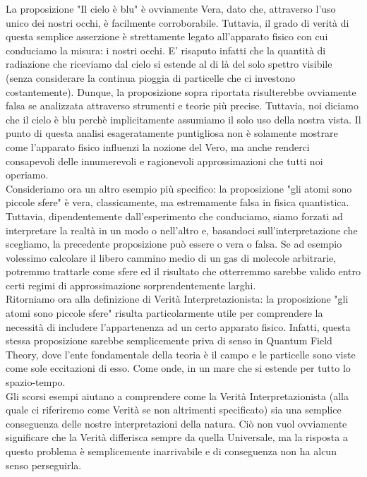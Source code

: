 \documentclass[]{scrbook}
\begin{document}
	La proposizione "Il cielo è blu" è ovviamente Vera, dato che, attraverso l'uso unico dei nostri occhi, è facilmente corroborabile. Tuttavia, il grado di verità di questa semplice asserzione è strettamente legato all'apparato fisico con cui conduciamo la misura: i nostri occhi. E' risaputo infatti che la quantità di radiazione che riceviamo dal cielo si estende al di là del solo spettro visibile (senza considerare la continua pioggia di particelle che ci investono costantemente). Dunque, la proposizione sopra riportata risulterebbe ovviamente falsa se analizzata attraverso strumenti e teorie più precise. Tuttavia, noi diciamo che il cielo è blu perchè implicitamente assumiamo il solo uso della nostra vista. Il punto di questa analisi esageratamente puntigliosa non è solamente mostrare come l'apparato fisico influenzi la nozione del Vero, ma anche renderci consapevoli delle innumerevoli e ragionevoli approssimazioni che tutti noi operiamo.\\
	Consideriamo ora un altro esempio più specifico: la proposizione "gli atomi sono piccole sfere" è vera, classicamente, ma estremamente falsa in fisica quantistica. Tuttavia, dipendentemente dall'esperimento che conduciamo, siamo forzati ad interpretare la realtà in un modo o nell'altro e, basandoci sull'interpretazione che scegliamo, la precedente proposizione può essere o vera o falsa. Se ad esempio volessimo calcolare il libero cammino medio di un gas di molecole arbitrarie, potremmo trattarle come sfere ed il risultato che otterremmo sarebbe valido entro certi regimi di approssimazione sorprendentemente larghi.\\
	Ritorniamo ora alla definizione di Verità Interpretazionista: la proposizione "gli atomi sono piccole sfere" risulta particolarmente utile per comprendere la necessità di includere l'appartenenza ad un certo apparato fisico. Infatti, questa stessa proposizione sarebbe semplicemente priva di senso in Quantum Field Theory, dove l'ente fondamentale della teoria è il campo e le particelle sono viste come sole eccitazioni di esso. Come onde, in un mare che si estende per tutto lo spazio-tempo.\\
	Gli scorsi esempi aiutano a comprendere come la Verità Interpretazionista (alla quale ci riferiremo come Verità se non altrimenti specificato) sia una semplice conseguenza delle nostre interpretazioni della natura. Ciò non vuol ovviamente significare che la Verità differisca sempre da quella Universale, ma la risposta a questo problema è semplicemente inarrivabile e di conseguenza non ha alcun senso perseguirla.\\
\end{document}
